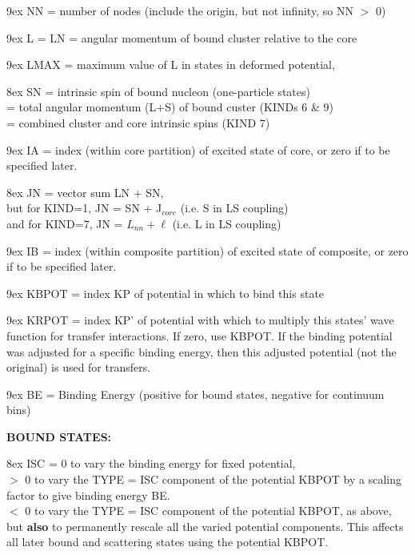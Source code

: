 \documentclass[11pt]{article}
\begin{document}
\hangindent 9ex
NN = number of nodes (include the origin, but not infinity, so NN $>$ 0)

\hangindent 9ex
L  = LN = angular momentum of bound cluster relative to the core

\hangindent 9ex
LMAX = maximum value of L in states in deformed potential,

\hangindent 8ex  SN
      = intrinsic spin of bound nucleon (one-particle states)
\\  = total angular momentum (L+S) of bound custer (KINDs 6 \& 9)
\\  = combined cluster and core intrinsic spins     (KIND 7)



\hangindent 9ex
IA = index (within core partition) of excited state of core,
or zero if to be specified later.

\hangindent 8ex  JN
     = vector sum LN + SN,
\\   but for KIND=1, JN = SN + J$_{core}$  (i.e. S in LS coupling)
\\    and for KIND=7, JN = $L_{nn} + \ell$     (i.e. L in LS coupling)



\hangindent 9ex
IB = index (within composite partition) of excited state of composite,
or zero if to be specified later.

\hangindent 9ex
KBPOT = index KP of potential in which to bind this state

\hangindent 9ex
KRPOT = index KP' of potential with which to multiply this states'
wave function for transfer interactions. If zero, use KBPOT.
If the binding potential was adjusted for a specific binding
energy, then this adjusted potential (not the original) is used
for transfers.

\hangindent 9ex
BE = Binding Energy (positive for bound states, negative for
continuum bins)

\bigskip
{\bf BOUND STATES:}


\hangindent 8ex  ISC
      = 0 to vary the binding energy for fixed potential,
\\  $>$ 0 to vary the TYPE = ISC component of the potential KBPOT
by a scaling factor to give binding energy BE.
\\  $<$ 0 to vary the TYPE = ISC component of the potential KBPOT,
as above, but {\bf also} to permanently rescale all the varied potential
components. This affects all later bound and scattering states using
the potential KBPOT.
\end{document}
